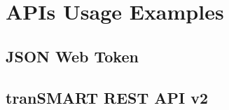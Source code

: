 \chapter{APIs Usage Examples}


\section{JSON Web Token}
\label{sec:appendix-jwt}

\section{tranSMART REST API v2}





